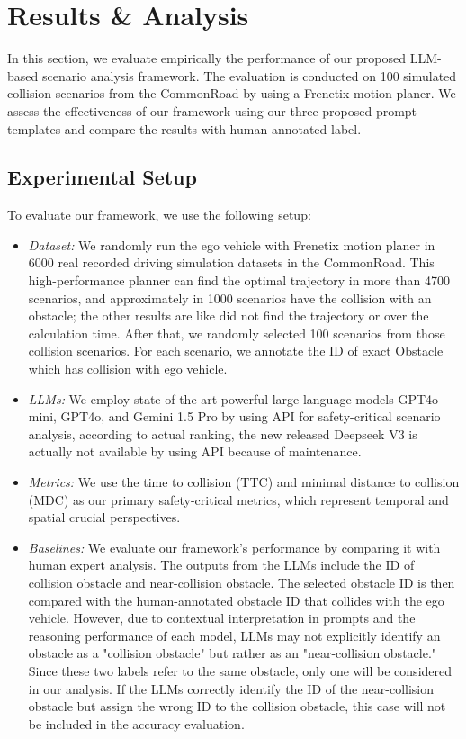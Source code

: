 \section{Results \& Analysis}
\label{sec:results}
In this section, we evaluate empirically the performance of our proposed LLM-based scenario analysis framework. The evaluation is conducted on 100 simulated collision scenarios  from the CommonRoad by using a Frenetix motion planer. We assess the effectiveness of our framework using our three proposed prompt templates and compare the results with human annotated label.

\subsection{Experimental Setup}
To evaluate our framework, we use the following setup:
\begin{itemize}
    \item \textit{Dataset:} We randomly run the ego vehicle with Frenetix motion planer in 6000 real recorded driving simulation datasets in the CommonRoad. This high-performance planner can find the optimal trajectory in more than 4700 scenarios, and approximately in 1000 scenarios have the collision with an obstacle; the other results are like did not find the trajectory or over the calculation time. After that, we randomly selected 100 scenarios from those collision scenarios. For each scenario, we annotate the ID of exact Obstacle which has collision with ego vehicle.
    \item \textit{LLMs:} We employ state-of-the-art powerful large language models GPT4o-mini, GPT4o, and Gemini 1.5 Pro by using API for safety-critical scenario analysis, according to actual ranking, the new released Deepseek V3 is actually not available by using API because of maintenance.
    \item \textit{Metrics:} We use the time to collision (TTC) and minimal distance to collision (MDC) as our primary safety-critical metrics, which represent temporal and spatial crucial perspectives.
    \item \textit{Baselines:} We evaluate our framework’s performance by comparing it with human expert analysis. The outputs from the LLMs include the ID of collision obstacle and near-collision obstacle. The selected obstacle ID is then compared with the human-annotated obstacle ID that collides with the ego vehicle. However, due to contextual interpretation in prompts and the reasoning performance of each model, LLMs may not explicitly identify an obstacle as a "collision obstacle" but rather as an "near-collision obstacle." Since these two labels refer to the same obstacle, only one will be considered in our analysis. If the LLMs correctly identify the ID of the near-collision obstacle but assign the wrong ID to the collision obstacle, this case will not be included in the accuracy evaluation.  
\end{itemize}
